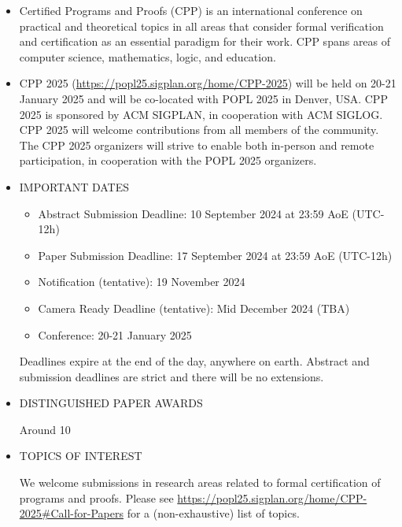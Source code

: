 \documentclass[prodmode,acmtecs]{acmsmall} %
\begin{document}
\begin{itemize}\item  Certified Programs and Proofs (CPP) is an international conference on practical and theoretical topics in all areas that consider formal verification and certification as an essential paradigm for their work. CPP spans areas of computer science, mathematics, logic, and education. 
 
\item  CPP 2025 (\href{https://popl25.sigplan.org/home/CPP-2025}{https://popl25.sigplan.org/home/CPP-2025}) will be held on 20-21 January 2025 and will be co-located with POPL 2025 in Denver, USA. CPP 2025 is sponsored by ACM SIGPLAN, in cooperation with ACM SIGLOG. CPP 2025 will welcome contributions from all members of the community. The CPP 2025 organizers will strive to enable both in-person and remote participation, in cooperation with the POPL 2025 organizers. 
 
\item  IMPORTANT DATES  
 
\begin{itemize}\item  Abstract Submission Deadline: 10 September 2024 at 23:59 AoE (UTC-12h)
\item  Paper Submission Deadline: 17 September 2024 at 23:59 AoE (UTC-12h)
\item  Notification (tentative): 19 November 2024
\item  Camera Ready Deadline (tentative): Mid December 2024 (TBA)
\item  Conference: 20-21 January 2025
\end{itemize} 
  Deadlines expire at the end of the day, anywhere on earth. Abstract and submission deadlines are strict and there will be no extensions. 
 
\item  DISTINGUISHED PAPER AWARDS  
 
  Around 10%
 
\item  TOPICS OF INTEREST   
 
  We welcome submissions in research areas related to formal certification of programs and proofs. Please see \href{https://popl25.sigplan.org/home/CPP-2025#Call-for-Papers}{https://popl25.sigplan.org/home/CPP-2025\#Call-for-Papers} for a (non-exhaustive) list of topics.  
 

\end{itemize}
\end{document}
